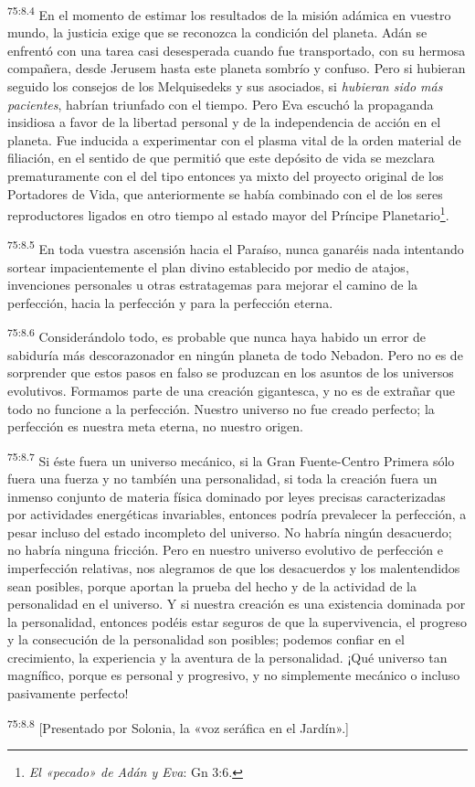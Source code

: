 \par
\textsuperscript{75:8.4} En el momento de estimar los resultados de la misión adámica en vuestro mundo, la justicia exige que se reconozca la condición del planeta. Adán se enfrentó con una tarea casi desesperada cuando fue transportado, con su hermosa compañera, desde Jerusem hasta este planeta sombrío y confuso. Pero si hubieran seguido los consejos de los Melquisedeks y sus asociados, si \textit{hubieran sido más pacientes}, habrían triunfado con el tiempo. Pero Eva escuchó la propaganda insidiosa a favor de la libertad personal y de la independencia de acción en el planeta. Fue inducida a experimentar con el plasma vital de la orden material de filiación, en el sentido de que permitió que este depósito de vida se mezclara prematuramente con el del tipo entonces ya mixto del proyecto original de los Portadores de Vida, que anteriormente se había combinado con el de los seres reproductores ligados en otro tiempo al estado mayor del Príncipe Planetario\footnote{\textit{El «pecado» de Adán y Eva}: Gn 3:6.}.

\par
\textsuperscript{75:8.5} En toda vuestra ascensión hacia el Paraíso, nunca ganaréis nada intentando sortear impacientemente el plan divino establecido por medio de atajos, invenciones personales u otras estratagemas para mejorar el camino de la perfección, hacia la perfección y para la perfección eterna.

\par
\textsuperscript{75:8.6} Considerándolo todo, es probable que nunca haya habido un error de sabiduría más descorazonador en ningún planeta de todo Nebadon. Pero no es de sorprender que estos pasos en falso se produzcan en los asuntos de los universos evolutivos. Formamos parte de una creación gigantesca, y no es de extrañar que todo no funcione a la perfección. Nuestro universo no fue creado perfecto; la perfección es nuestra meta eterna, no nuestro origen.

\par
\textsuperscript{75:8.7} Si éste fuera un universo mecánico, si la Gran Fuente-Centro Primera sólo fuera una fuerza y no tambíén una personalidad, si toda la creación fuera un inmenso conjunto de materia física dominado por leyes precisas caracterizadas por actividades energéticas invariables, entonces podría prevalecer la perfección, a pesar incluso del estado incompleto del universo. No habría ningún desacuerdo; no habría ninguna fricción. Pero en nuestro universo evolutivo de perfección e imperfección relativas, nos alegramos de que los desacuerdos y los malentendidos sean posibles, porque aportan la prueba del hecho y de la actividad de la personalidad en el universo. Y si nuestra creación es una existencia dominada por la personalidad, entonces podéis estar seguros de que la supervivencia, el progreso y la consecución de la personalidad son posibles; podemos confiar en el crecimiento, la experiencia y la aventura de la personalidad. ¡Qué universo tan magnífico, porque es personal y progresivo, y no simplemente mecánico o incluso pasivamente perfecto!

\par
\textsuperscript{75:8.8} [Presentado por Solonia, la «voz seráfica en el Jardín».]